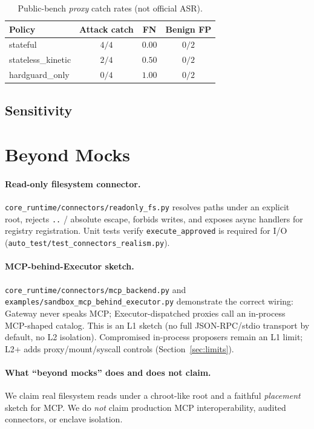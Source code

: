 \documentclass{article}
\begin{document}
\begin{table}[t]
\centering
\caption{Public-bench \emph{proxy} catch rates (not official ASR).}
\label{tab:proxy}
\small
\begin{tabular}{lccc}
\toprule
\textbf{Policy} & \textbf{Attack catch} & \textbf{FN} & \textbf{Benign FP} \\
\midrule
stateful & $4/4$ & $0.00$ & $0/2$ \\
stateless\_kinetic & $2/4$ & $0.50$ & $0/2$ \\
hardguard\_only & $0/4$ & $1.00$ & $0/2$ \\
\bottomrule
\end{tabular}
\end{table}

\subsection{Sensitivity}
\label{sec:sensitivity}


\section{Beyond Mocks}
\label{sec:beyond}

\paragraph{Read-only filesystem connector.}
\texttt{core\_runtime/connectors/readonly\_fs.py} resolves paths under an
explicit root, rejects \texttt{..} / absolute escape, forbids writes, and
exposes async handlers for registry registration. Unit tests verify
\texttt{execute\_approved} is required for I/O
(\texttt{auto\_test/test\_connectors\_realism.py}).

\paragraph{MCP-behind-Executor sketch.}
\texttt{core\_runtime/connectors/mcp\_backend.py} and
\texttt{examples/sandbox\_mcp\_behind\_executor.py} demonstrate the correct
wiring: Gateway never speaks MCP; Executor-dispatched proxies call an
in-process MCP-shaped catalog. This is an L1 sketch (no full JSON-RPC/stdio
transport by default, no L2 isolation). Compromised in-process proposers
remain an L1 limit; L2+ adds proxy/mount/syscall controls
(Section~\ref{sec:limits}).

\paragraph{What ``beyond mocks'' does and does not claim.}
We claim real filesystem reads under a chroot-like root and a faithful
\emph{placement} sketch for MCP. We do \emph{not} claim production MCP
interoperability, audited connectors, or enclave isolation.
\end{document}
